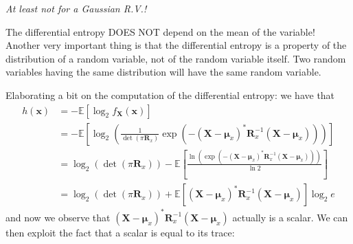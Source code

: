 \documentclass[a4paper, 12pt]{book}
\begin{document}
\textit{At least not for a Gaussian R.V.!}

The differential entropy DOES NOT depend on the mean of the variable!
Another very important thing is that the differential entropy is a property of the distribution of a random variable, not of the random variable itself.
Two random variables having the same distribution will have the same random variable.

\begin{center}
\end{center}

Elaborating a bit on the computation of the differential entropy: we have that
\begin{align*}
    h(\bm{x}) &= -\mathbb{E}[\log_2 f_{\bm{X}}(\bm{x})] \tag{1.23} \\
    &= -\mathbb{E}\left[ \log_2 \left( \frac{1}{\det(\pi \bm{R}_x)} \exp(-(\bm{X} - \bm{\mu}_x)^* \bm{R}_x^{-1} (\bm{X} - \bm{\mu}_x)) \right) \right] \\
    &= \log_2(\det(\pi \bm{R}_x)) - \mathbb{E}\left[ \frac{\ln(\exp(-(\bm{X} - \bm{\mu}_x)^* \bm{R}_x^{-1} (\bm{X} - \bm{\mu}_x)))}{\ln 2} \right] \\
    &= \log_2(\det(\pi \bm{R}_x)) + \mathbb{E}\left[ (\bm{X} - \bm{\mu}_x)^* \bm{R}_x^{-1} (\bm{X} - \bm{\mu}_x) \right] \log_2 e \tag{1.24}
\end{align*}
and now we observe that $(\bm{X} - \bm{\mu}_x)^* \bm{R}_x^{-1} (\bm{X} - \bm{\mu}_x)$ actually is a scalar. We can then exploit the fact that a scalar is equal to its trace:
\end{document}
